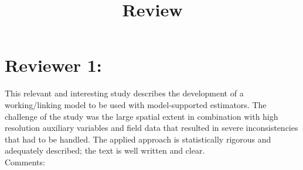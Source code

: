 \documentclass{article}
\title{Review\\\vspace{1cm}}
\author{}
\begin{document}

\maketitle
\thispagestyle{empty}
\newpage

\setcounter{page}{1}

\pagestyle{fancy} %
\fancyfoot[C]{\thepage}
\setlength{\headsep}{15mm}

\newcommand{\answer}[1]{\small \color{mybrown}{#1} \color{black}}
\newcommand{\note}[1]{\textit{\small \color{amaranth} \textbf{Note:} #1} \color{black}}
\newcommand{\todo}[1]{\color{red}{#1} \color{black}}



\section*{Reviewer 1:}

This relevant and interesting study describes the development of a working/linking model to be used with model-supported estimators. The challenge of the study was the large spatial extent in combination with high resolution auxiliary variables and field data that resulted in severe inconsistencies that had to be handled. The applied approach is statistically rigorous and adequately described; the text is well written and clear.\\

Comments:\\
\end{document}
